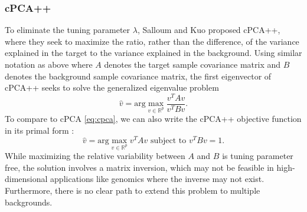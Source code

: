 \documentclass[nocrop]{bioinfo}
\begin{document}
\subsubsection{cPCA++}
To eliminate the tuning parameter $\lambda$, Salloum and Kuo  \cite{Salloum} proposed cPCA++, where they seek to maximize the ratio, rather than the difference, of the variance explained in the target to the variance explained in the background.
Using similar notation as above where $A$ denotes the target sample covariance matrix and $B$ denotes the background sample covariance matrix, the first eigenvector of cPCA++ seeks to solve the generalized eigenvalue problem
\[\hat{v} = \text{arg}\max_{v\in \mathbb{R}^p} \frac{v^T A v}{v^T B v}.\]
To compare to cPCA \eqref{eq:cpca}, we can also write the cPCA++ objective function in its primal form \cite{ghojogh2019eigenvalue}:
\begin{equation}
  \label{eq:cpca++}
  \hat{v} = \text{arg}\max_{v \in \mathbb{R}^p}{v^T A v}  \mbox{ subject to } v^T B v = 1.
\end{equation}
While maximizing the relative variability between $A$ and $B$ is tuning parameter free, the solution involves a matrix inversion, which may not be feasible in high-dimensional applications like genomics where the inverse may not exist.  Furthermore, there is no clear path to extend this problem to multiple backgrounds.
\end{document}
